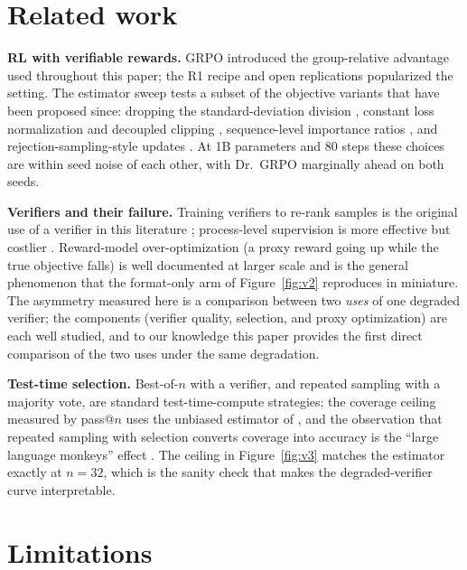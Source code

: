 \documentclass{article}
\begin{document}
\section{Related work}
\label{sec:related}

\textbf{RL with verifiable rewards.} GRPO \citep{shao2024deepseekmath} introduced the group-relative advantage used throughout this paper; the R1 recipe \citep{guo2025deepseekr1} and open replications popularized the setting. The estimator sweep tests a subset of the objective variants that have been proposed since: dropping the standard-deviation division \citep{liu2025understanding}, constant loss normalization and decoupled clipping \citep{yu2025dapo}, sequence-level importance ratios \citep{zheng2025gspo}, and rejection-sampling-style updates \citep{lambert2024tulu3}. At 1B parameters and 80 steps these choices are within seed noise of each other, with Dr.~GRPO marginally ahead on both seeds.

\textbf{Verifiers and their failure.} Training verifiers to re-rank samples is the original use of a verifier in this literature \citep{cobbe2021training}; process-level supervision is more effective but costlier \citep{lightman2023letverify,uesato2022solving}. Reward-model over-optimization (a proxy reward going up while the true objective falls) is well documented at larger scale \citep{gao2023scaling} and is the general phenomenon that the format-only arm of Figure~\ref{fig:v2} reproduces in miniature. The asymmetry measured here is a comparison between two \emph{uses} of one degraded verifier; the components (verifier quality, selection, and proxy optimization) are each well studied, and to our knowledge this paper provides the first direct comparison of the two uses under the same degradation.

\textbf{Test-time selection.} Best-of-$n$ with a verifier, and repeated sampling with a majority vote, are standard test-time-compute strategies; the coverage ceiling measured by pass@$n$ uses the unbiased estimator of \citep{chen2021evaluating}, and the observation that repeated sampling with selection converts coverage into accuracy is the ``large language monkeys'' effect \citep{brown2024monkeys}. The ceiling in Figure~\ref{fig:v3} matches the estimator exactly at $n=32$, which is the sanity check that makes the degraded-verifier curve interpretable.

\section{Limitations}
\label{sec:limitations}
\end{document}
